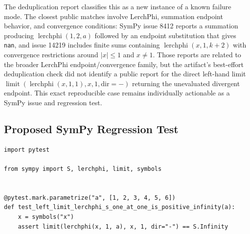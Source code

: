 \documentclass[11pt]{article}
\begin{document}
The deduplication report classifies this as a new instance of a known failure mode. The closest public matches involve LerchPhi, summation endpoint behavior, and convergence conditions: SymPy issue 8412 reports a summation producing \(\operatorname{lerchphi}(1,2,a)\) followed by an endpoint substitution that gives \texttt{nan}, and issue 14219 includes finite sums containing \(\operatorname{lerchphi}(x,1,k+2)\) with convergence restrictions around \(|x|\leq 1\) and \(x\neq 1\). Those reports are related to the broader LerchPhi endpoint/convergence family, but the artifact's best-effort deduplication check did not identify a public report for the direct left-hand limit \(\operatorname{limit}(\operatorname{lerchphi}(x,1,1),x,1,\mathrm{dir}=-)\) returning the unevaluated divergent endpoint. This exact reproducible case remains individually actionable as a SymPy issue and regression test.

\subsection{Proposed SymPy Regression Test}

\medskip

\begin{lstlisting}[style=bugpython]
import pytest

from sympy import S, lerchphi, limit, symbols


@pytest.mark.parametrize("a", [1, 2, 3, 4, 5, 6])
def test_left_limit_lerchphi_s_one_at_one_is_positive_infinity(a):
    x = symbols("x")
    assert limit(lerchphi(x, 1, a), x, 1, dir="-") == S.Infinity
\end{lstlisting}
\end{document}

